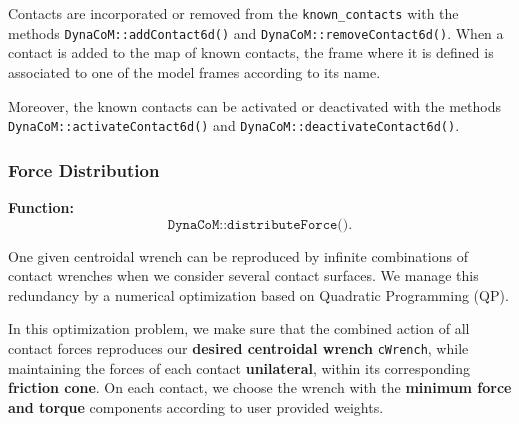 \documentclass[12pt]{article}
\begin{document}
Contacts are incorporated or removed from the \texttt{known\_contacts} with the methods \texttt{DynaCoM::addContact6d()} and \texttt{DynaCoM::removeContact6d()}. When a contact is added to the map of known contacts, the frame where it is defined is associated to one of the model frames according to its name.

Moreover, the known contacts can be activated or deactivated with the methods \texttt{DynaCoM::activateContact6d()} and \texttt{DynaCoM::deactivateContact6d()}.

\subsubsection{Force Distribution} \label{Sec.ForceDist}

{\bf Function:}
\begin{equation*}
    \texttt{DynaCoM::distributeForce()}.
\end{equation*}

One given centroidal wrench can be reproduced by infinite combinations of contact wrenches when we consider several contact surfaces. We manage this redundancy by a numerical optimization based on Quadratic Programming (QP).

In this optimization problem, we make sure that the combined action of all contact forces reproduces our {\bf desired centroidal wrench} \texttt{cWrench}, while maintaining the forces of each contact {\bf unilateral}, within its corresponding {\bf friction cone}. On each contact, we choose the wrench with the {\bf minimum force and torque} components according to user provided weights.
\end{document}
